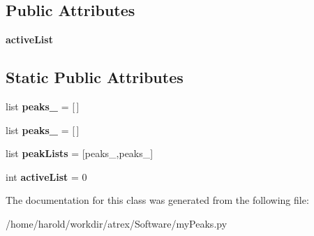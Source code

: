 \subsection*{Public Attributes}
\begin{DoxyCompactItemize}
\item 
\hypertarget{classmyPeaks_1_1myPeaks_ab764afe03c88786678b9b63fa09337ef}{{\bfseries active\-List}}\label{classmyPeaks_1_1myPeaks_ab764afe03c88786678b9b63fa09337ef}

\end{DoxyCompactItemize}
\subsection*{Static Public Attributes}
\begin{DoxyCompactItemize}
\item 
\hypertarget{classmyPeaks_1_1myPeaks_a188582bdcbbda828a9d44fd7336570d8}{list {\bfseries peaks\-\_} = \mbox{[}$\,$\mbox{]}}\label{classmyPeaks_1_1myPeaks_a188582bdcbbda828a9d44fd7336570d8}

\item 
\hypertarget{classmyPeaks_1_1myPeaks_acba3b1f63dcd097b793f8cbcb0e0befc}{list {\bfseries peaks\-\_} = \mbox{[}$\,$\mbox{]}}\label{classmyPeaks_1_1myPeaks_acba3b1f63dcd097b793f8cbcb0e0befc}

\item 
\hypertarget{classmyPeaks_1_1myPeaks_a769d8400c803069ed2de73079e5e8b08}{list {\bfseries peak\-Lists} = \mbox{[}peaks\-\_,peaks\-\_\mbox{]}}\label{classmyPeaks_1_1myPeaks_a769d8400c803069ed2de73079e5e8b08}

\item 
\hypertarget{classmyPeaks_1_1myPeaks_ae28250cdc31d2022b52ebd0b35b61ad9}{int {\bfseries active\-List} = 0}\label{classmyPeaks_1_1myPeaks_ae28250cdc31d2022b52ebd0b35b61ad9}

\end{DoxyCompactItemize}


The documentation for this class was generated from the following file\-:\begin{DoxyCompactItemize}
\item 
/home/harold/workdir/atrex/\-Software/my\-Peaks.\-py\end{DoxyCompactItemize}
